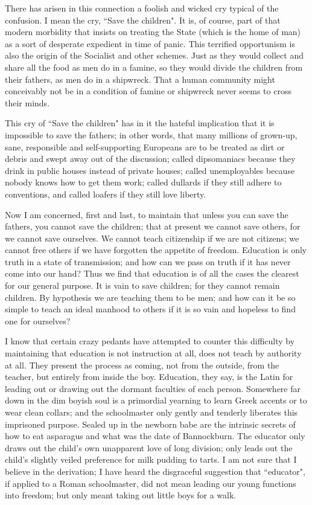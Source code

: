 \documentclass[final,10pt,letterpaper,twocolumn,openany]{book}
\begin{document}
There has arisen in this connection a foolish and wicked cry typical of
the confusion. I mean the cry, ``Save the children". It is, of course, part of
that modern morbidity that insists on treating the State (which is the home
of man) as a sort of desperate expedient in time of panic. This terrified
opportunism is also the origin of the Socialist and other schemes. Just as
they would collect and share all the food as men do in a famine, so they
would divide the children from their fathers, as men do in a shipwreck.
That a human community might conceivably not be in a condition of
famine or shipwreck never seems to cross their minds. 

This cry of ``Save
the children" has in it the hateful implication that it is impossible to save
the fathers; in other words, that many millions of grown-up, sane,
responsible and self-supporting Europeans are to be treated as dirt or
debris and swept away out of the discussion; called dipsomaniacs because
they drink in public houses instead of private houses; called
unemployables because nobody knows how to get them work; called
dullards if they still adhere to conventions, and called loafers if they still
love liberty. 

Now I am concerned, first and last, to maintain that unless
you can save the fathers, you cannot save the children; that at present we
cannot save others, for we cannot save ourselves. We cannot teach
citizenship if we are not citizens; we cannot free others if we have
forgotten the appetite of freedom. Education is only truth in a state of
transmission; and how can we pass on truth if it has never come into our
hand? Thus we find that education is of all the cases the clearest for our
general purpose. It is vain to save children; for they cannot remain
children. By hypothesis we are teaching them to be men; and how can it
be so simple to teach an ideal manhood to others if it is so vain and
hopeless to find one for ourselves?

I know that certain crazy pedants have attempted to counter this
difficulty by maintaining that education is not instruction at all, does not
teach by authority at all. They present the process as coming, not from the
outside, from the teacher, but entirely from inside the boy. Education, they
say, is the Latin for leading out or drawing out the dormant faculties of
each person. Somewhere far down in the dim boyish soul is a primordial
yearning to learn Greek accents or to wear clean collars; and the
schoolmaster only gently and tenderly liberates this imprisoned purpose.
Sealed up in the newborn babe are the intrinsic secrets of how to eat
asparagus and what was the date of Bannockburn. The educator only
draws out the child's own unapparent love of long division; only leads out
the child's slightly veiled preference for milk pudding to tarts. I am not
sure that I believe in the derivation; I have heard the disgraceful
suggestion that ``educator", if applied to a Roman schoolmaster, did not
mean leading our young functions into freedom; but only meant taking out
little boys for a walk. 
\end{document}
